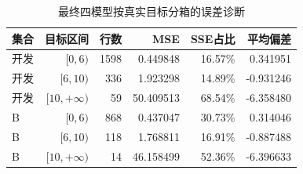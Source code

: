 \begin{table}[htbp]
\small
\setlength{\tabcolsep}{5pt}
\centering
\caption{最终四模型按真实目标分箱的误差诊断}
\label{tab:bands}
\begin{tabular}{lrrrrr}
\toprule
集合 & 目标区间 & 行数 & MSE & SSE占比 & 平均偏差 \\
\midrule
开发 & $[0,6)$ & 1598 & 0.449848 & 16.57\% & 0.341951 \\
开发 & $[6,10)$ & 336 & 1.923298 & 14.89\% & -0.931246 \\
开发 & $[10,+\infty)$ & 59 & 50.409513 & 68.54\% & -6.358480 \\
B & $[0,6)$ & 868 & 0.437047 & 30.73\% & 0.314046 \\
B & $[6,10)$ & 118 & 1.768811 & 16.91\% & -0.887488 \\
B & $[10,+\infty)$ & 14 & 46.158499 & 52.36\% & -6.396633 \\
\bottomrule
\end{tabular}
\end{table}
